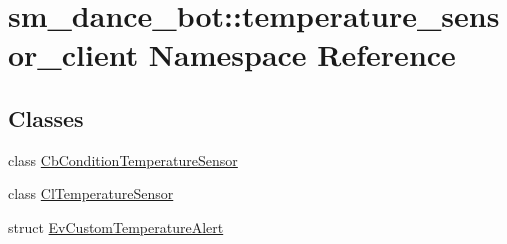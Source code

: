 \hypertarget{namespacesm__dance__bot_1_1temperature__sensor__client}{}\section{sm\+\_\+dance\+\_\+bot\+:\+:temperature\+\_\+sensor\+\_\+client Namespace Reference}
\label{namespacesm__dance__bot_1_1temperature__sensor__client}
\subsection*{Classes}
\begin{DoxyCompactItemize}
\item 
class \hyperlink{classsm__dance__bot_1_1temperature__sensor__client_1_1CbConditionTemperatureSensor}{Cb\+Condition\+Temperature\+Sensor}
\item 
class \hyperlink{classsm__dance__bot_1_1temperature__sensor__client_1_1ClTemperatureSensor}{Cl\+Temperature\+Sensor}
\item 
struct \hyperlink{structsm__dance__bot_1_1temperature__sensor__client_1_1EvCustomTemperatureAlert}{Ev\+Custom\+Temperature\+Alert}
\end{DoxyCompactItemize}
